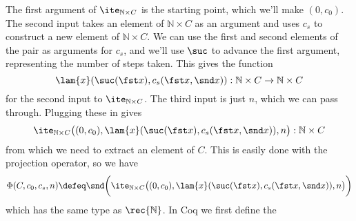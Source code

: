     The first argument of $\ite_{\mathbb{N} \times C}$ is the starting point,
    which we'll make $(0, c_{0})$.  The second input takes an element of
    $\mathbb{N} \times C$ as an argument and uses $c_{s}$ to construct a new
    element of $\mathbb{N} \times C$.  We can use the first and second elements of
    the pair as arguments for $c_{s}$, and we'll use $\suc$ to advance the first
    argument, representing the number of steps taken.  This gives the function
    \[
    \lam{x}(\suc(\fst x), c_{s}(\fst x, \snd x)) 
    : \mathbb{N} \times C \to \mathbb{N} \times C
    \]
    for the second input to $\ite_{\mathbb{N} \times C}$.  The third input is just
    $n$, which we can pass through.  Plugging these in gives
    \[
    \ite_{\mathbb{N} \times C}\big(
    (0, c_{0}),
    \lam{x}(\suc(\fst x), c_{s}(\fst x, \snd x)),
    n
    \big)
    : \mathbb{N} \times C
    \]
    from which we need to extract an element of $C$.  This is easily done with the
    projection operator, so we have
    \[
    \Phi(C, c_{0}, c_{s}, n) \defeq
    \snd\bigg(
    \ite_{\mathbb{N} \times C}\big(
    (0, c_{0}),
    \lam{x}(\suc(\fst x), c_{s}(\fst x, \snd x)),
    n
    \big)
    \bigg)
    \]
    which has the same type as $\rec{\mathbb{N}}$.  In Coq we first define the
